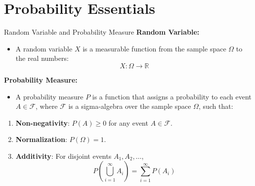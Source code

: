 \documentclass[xcolor=svgnames,t]{beamer}
\begin{document}
\section{Probability Essentials}
\begin{frame}{Random Variable and Probability Measure}
    \textbf{Random Variable:}
    \begin{itemize}
      \item A random variable \( X \) is a measurable function from the sample space \( \Omega \) to the real numbers: 
      \[
      X: \Omega \rightarrow \mathbb{R}
      \]
    \end{itemize}

    \vspace{0.5cm}
    \pause
    \textbf{Probability Measure:}
    \begin{itemize}
        \item A probability measure \( P \) is a function that assigns a probability to each event \( A \in \mathcal{F} \), where \( \mathcal{F} \) is a sigma-algebra over the sample space \( \Omega \), such that:

    \end{itemize}
    \pause
    \vspace{0.5cm}
    \begin{enumerate}[<+->]
        \item \textbf{Non-negativity}: \( P(A) \geq 0 \) for any event \( A \in \mathcal{F} \).
        \item \textbf{Normalization}: \( P(\Omega) = 1 \).
        \item \textbf{Additivity}: For disjoint events \( A_1, A_2, \dots \), 
        \[
        P\left( \bigcup_{i=1}^{\infty} A_i \right) = \sum_{i=1}^{\infty} P(A_i)
        \]
    \end{enumerate}
\end{frame}
\end{document}
